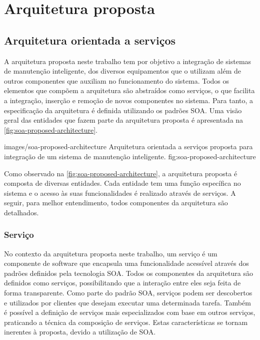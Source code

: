 \chapter{Arquitetura proposta}



\section{Arquitetura orientada a serviços}

A arquitetura proposta neste trabalho tem por objetivo a integração de sistemas de manutenção
inteligente, dos diversos equipamentos que o utilizam além de outros componentes que auxiliam no
funcionamento do sistema. Todos os elementos que compõem a arquitetura são abstraídos como serviços,
o que facilita a integração, inserção e remoção de novos componentes no sistema. Para tanto, a
especificação da arquitetura é definida utilizando os padrões \gls{SOA}. Uma visão geral das
entidades que fazem parte da arquitetura proposta é apresentada na \cref{fig:soa-proposed-architecture}.

    {images/soa-proposed-architecture}
    {Arquitetura orientada a serviços proposta para integração de um sistema de manutenção
        inteligente.}
    {fig:soa-proposed-architecture}

Como observado na \cref{fig:soa-proposed-architecture}, a arquitetura proposta é composta de
diversas entidades. Cada entidade tem uma função específica no sistema e o acesso às suas
funcionalidades é realizado através de serviços. A seguir, para melhor entendimento, todos
componentes da arquitetura são detalhados.


\subsection{Serviço}

No contexto da arquitetura proposta neste trabalho, um serviço é um componente de software que
encapsula uma funcionalidade acessível através dos padrões definidos pela tecnologia \gls{SOA}.
Todos os componentes da arquitetura são definidos como serviços, possibilitando que a interação
entre eles seja feita de forma transparente. Como parte do padrão \gls{SOA}, serviços podem ser
descobertos e utilizados por clientes que desejam executar uma determinada tarefa. Também é possível
a definição de serviços mais especializados com base em outros serviços, praticando a técnica da
composição de serviços. Estas características se tornam inerentes à proposta, devido a utilização de
\gls{SOA}.


